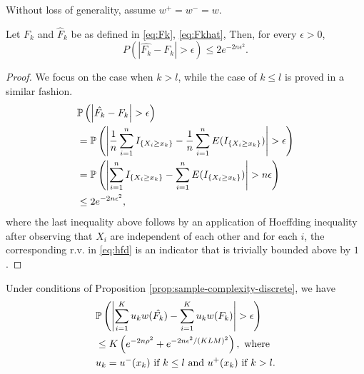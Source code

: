
Without loss of generality, assume $w^+=w^-=w$.

\begin{proposition}
\label{prop:hoeffding-discrete}
Let $F_k$ and $\hat F_k$ be as defined in \eqref{eq:Fk}, \eqref{eq:Fkhat}, Then, for every $\epsilon >0$, 
$$P(|\hat{F_k}-F_k| > \epsilon) \leq 2 e^{-2n \epsilon^2}.$$
\end{proposition}
\begin{proof}
We focus on the case when $k > l$, while the case of $k \leq l$ is proved in a similar fashion.
\begin{align}
&\mathbb{P}\left( \left|\hat{F_k}- F_k \right| > \epsilon \right)  \nonumber\\
&= \mathbb{P}\left( \left| \frac{1}{n} \sum_{i=1}^n I_{\{X_i \geq x_k\}} - \frac{1}{n} \sum_{i=1}^n E(I_{\{X_i \geq x_k\}}) \right| > \epsilon \right) \nonumber\\ 
& = \mathbb{P}\left( \left|\sum_{i=1}^n I_{\{X_i \geq x_k\}} - \sum_{i=1}^n E(I_{\{X_i \geq x_k\}}) \right| > n\epsilon \right) \label{eq:hfd} \\ 
& \leq 2e^{-2n \epsilon^2},
\end{align}
where the last inequality above follows by an application of Hoeffding inequality after observing that $X_i$ are independent of each other and for each $i$, the corresponding r.v. in \eqref{eq:hfd} is an indicator that is trivially bounded above by $1$.
\end{proof}
\begin{proposition}
\label{prop:discrete-first-term}
Under conditions of Proposition \ref{prop:sample-complexity-discrete}, we have
\begin{align}
&\mathbb{P}\left( \left| \sum_{i=1}^K u_{k} w(\hat{F_k}) - \sum_{i=1}^K u_{k} w(F_k) \right| >\epsilon \right)\nonumber\\
& \le K\left(
e^{-2n\rho^2} + e^{-2n\epsilon^2 /(KLM)^2}\right), \text{ where }\nonumber\\
&u_k = 
   u^{-}(x_{k})  \text{ if   } k \leq l \text{ and } 
   u^{+}(x_{k})  \text{ if  }  k > l.
 \label{eq:uplusminusxk}
\end{align} 
\end{proposition}

